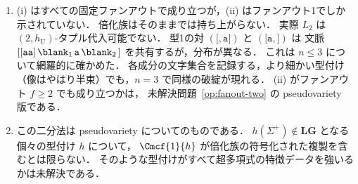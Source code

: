 \begin{remark}[二分法の適用範囲]
\label{rem:dichotomy-scope}
\begin{enumerate}[label=\textup{(\roman*)},leftmargin=*]
\item (i) はすべての固定ファンアウトで成り立つが，(ii) はファンアウト1でしか示されていない．
倍化族はそのままでは持ち上がらない．
実際 $L_2$ は $(2,h_{\mathrm U})$-タプル代入可能でない．
型1の対 $(\mathtt[,\mathtt a\mathtt])$ と $(\mathtt[\mathtt a,\mathtt])$ は
文脈 $\mathtt{[[aa]}\,\blank_1\,\mathtt a\,\blank_2\,\mathtt]$ を共有するが，分布が異なる．
これは $n\le3$ について網羅的に確かめた．
各成分の文字集合を記録する，より細かい型付け（像はやはり半束）でも，$n=3$ で同様の破綻が現れる．
(ii) がファンアウト $f\ge2$ でも成り立つかは，
未解決問題~\ref{op:fanout-two} の pseudovariety 版である．
\item この二分法は pseudovariety についてのものである．
$h(\Sigma^+)\notin\mathbf{LG}$ となる個々の型付け $h$ について，
$\Cmcf{1}{h}$ が倍化族の符号化された複製を含むとは限らない．
そのような型付けがすべて超多項式の特徴データを強いるかは未解決である．
\end{enumerate}
\end{remark}
